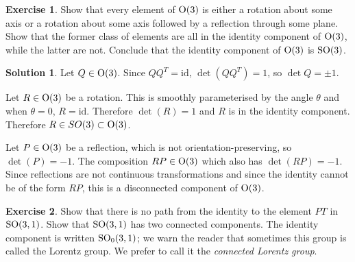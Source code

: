 \documentclass[11pt, a4paper]{report}
\theoremstyle{definition}
\newtheorem{ex}{Exercise}[part]
\newtheorem{sol}{Solution}[part]
\renewcommand*{\O}{\ensuremath\text{O}}
\newcommand*{\SO}{\ensuremath\text{SO}}
\begin{document}
\begin{ex}

Show that every element of $\O(3)$ is either a rotation about some axis or a rotation about some axis followed by a reflection through some plane.
Show that the former class of elements are all in the identity component of $\O(3)$, while the latter are not.
Conclude that the identity component of $\O(3)$ is $\SO(3)$.

\end{ex}

\begin{sol}

Let $Q \in \O(3)$. Since $QQ^T = \text{id}$, $\det(QQ^T) = 1$, so $\det{Q} = \pm 1$.

Let $R \in \O(3)$ be a rotation. This is smoothly parameterised by the angle $\theta$ and when $\theta = 0$, $R = \text{id}$.
Therefore $\det(R) = 1$ and $R$ is in the identity component.
Therefore $R \in SO(3) \subset \O(3)$.

Let $P \in \O(3)$ be a reflection, which is not orientation-preserving, so $\det(P) = -1$.
The composition $RP \in \O(3)$ which also has $\det(RP) = -1$.
Since reflections are not continuous transformations and since the identity cannot be of the form $RP$, this is a disconnected component of $\O(3)$.

\end{sol}

\begin{ex}

Show that there is no path from the identity to the element $PT$ in $\SO(3, 1)$.
Show that $\SO(3, 1)$ has two connected components.
The identity component is written $\SO_0(3, 1)$;
we warn the reader that sometimes this group is called the Lorentz group.
We prefer to call it the \emph{connected Lorentz group}.

\end{ex}
\end{document}
